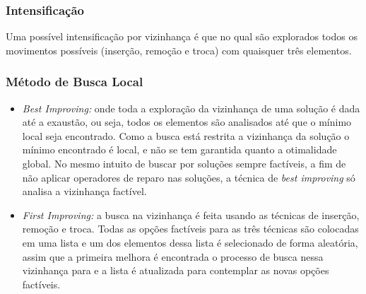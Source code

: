 \documentclass[12pt,a4paper]{article}
\begin{document}




    \subsubsection{Intensificação}

        Uma possível intensificação por vizinhança é que no qual são explorados todos os movimentos possíveis (inserção, remoção e troca) com quaisquer três elementos. 

    \subsubsection{Método de Busca Local}

        \begin{itemize}

        \item {\it Best Improving:} onde toda a exploração da vizinhança de uma solução é dada até a exaustão, ou seja, todos os elementos são analisados até que o mínimo local seja encontrado. Como
            a busca está restrita a vizinhança da solução o mínimo encontrado é local, e não se tem garantida quanto a otimalidade global. No mesmo intuito de buscar por soluções sempre factíveis, a
                fim de não aplicar operadores de reparo nas soluções, a técnica de {\it best improving} só analisa a vizinhança factível. 

        \item {\it First Improving:} a busca na vizinhança é feita usando as técnicas de inserção, remoção e troca. Todas as opções factíveis para as três técnicas são colocadas em uma lista
        e um dos elementos dessa lista é selecionado de forma aleatória, assim que a primeira melhora é encontrada o processo de busca nessa vizinhança para e a lista é atualizada para
        contemplar as novas opções factíveis. 
        \end{itemize}
\end{document}

